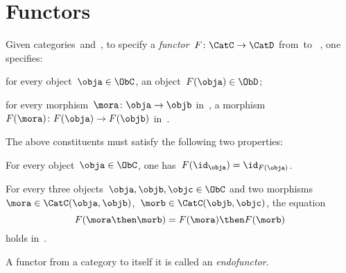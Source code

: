 
\section{Functors}
\begin{ctdefinition}[Functor]
  \label{def:functor}
  Given categories~\CatC and~\CatD, to specify a \emph{functor}~$F\colon \CatC\to \CatD$ from~\CatC to ~\CatD, one specifies:
  \begin{compactenum}
    \item for every object~$\obja \in \ObC$, an object~$F(\obja)\in \ObD$;
    \item for every morphism~$\mora \colon \obja \to \objb$ in~\CatC, a morphism~$F(\mora)\colon F(\obja)\to F(\objb)$ in~\CatD.
  \end{compactenum}
  The above constituents must satisfy the following two properties:
  \begin{compactenum}[(a)]
    \item For every object~$\obja\in \ObC$, one has~$F(\id_\obja)=\id_{F(\obja)}$.
    \item For every three objects~$\obja,\objb,\objc \in \ObC$ and two morphisms~$\mora \in \CatC(\obja,\objb)$,~$\morb\in \CatC(\objb,\objc)$, the equation
    \begin{equation}
      F(\mora \then \morb)=F(\mora)\then F(\morb)
    \end{equation}
    holds in~\CatD.
  \end{compactenum}
\end{ctdefinition}

\begin{remark}
  A functor from a category to itself it is called an \emph{endofunctor}.
\end{remark}

